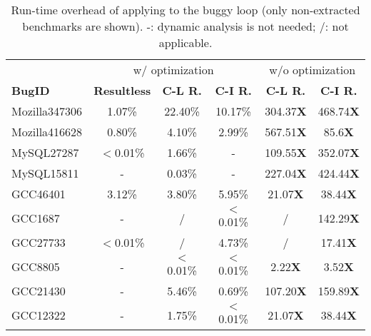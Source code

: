 \begin{table}
  \centering
  \scriptsize
  \newcommand{\Yes}[1]{\checkmark{}$_#1$}
  \newcommand{\No}[0]{-}
  \begin{tabular}{lccccc}
    \toprule
	    & \multicolumn{3}{c}{\Tool w/ optimization} & \multicolumn{2}{c}{w/o optimization} \\
     \cmidrule(lr){2-4}
     \cmidrule(lr){5-6}
     {\bf BugID}  & {\bf Resultless}  &  {\bf C-L R. } & {\bf C-I R. }  & {\bf C-L R.}  & {\bf C-I R. } \\
    \midrule
    Mozilla347306 &  1.07\%           &  22.40\%       &  10.17\%       & 304.37{\bf X} & 468.74{\bf X} \\ 
    Mozilla416628 &  0.80\%           &  4.10\%        &  2.99\%        & 567.51{\bf X} & 85.6{\bf X} \\
    \midrule
     MySQL27287   & $<$0.01\%           &   1.66\%       &   -            & 109.55{\bf X} & 352.07{\bf X} \\
     MySQL15811   &  -                &   0.03\%       &   -            & 227.04{\bf X} & 424.44{\bf X} \\
    \midrule
      GCC46401    & 3.12\%         & 3.80\%            &  5.95\%        & 21.07{\bf X}  & 38.44{\bf X}\\ 
      GCC1687     & -              & /                 &  $<$0.01\%       &   /           & 142.29{\bf X} \\
      GCC27733    & $<$0.01\%        & /                 &  4.73\%        &   /           & 17.41{\bf X}     \\
      GCC8805     & -              & $<$0.01\%           & $<$0.01\%        & 2.22{\bf X}   &  3.52{\bf X}\\
      GCC21430    & -              & 5.46\%            &   0.69\%       & 107.20{\bf X} & 159.89{\bf X} \\
      GCC12322    & -              & 1.75\%            &  $<$0.01\%       & 21.07{\bf X}  & 38.44{\bf X} \\
   \bottomrule
   \end{tabular}
  \caption{Run-time overhead of applying \Tool to the buggy loop
    (only non-extracted benchmarks are shown). 
  -: dynamic analysis is not needed;
  /: not applicable.}
  \label{tab:performance}
\end{table}


